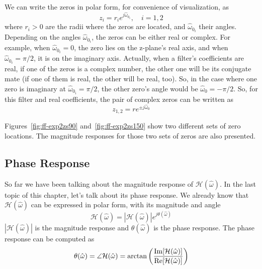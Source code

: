 We can write the zeros in polar form, for convenience of
visualization, as
\begin{equation}
z_{i}=r_i e^{j \hat{\omega}_{0_i}}, \quad i=1,2
\end{equation}
where $r_i>0$ are the radii where the zeros are located, and
$\hat{\omega}_{0_i}$ their angles.  Depending on the angles
$\hat{\omega}_{0_i}$, the zeros can be either real or complex. For
example, when $\hat{\omega}_{0_i}=0$, the zero lies on the z-plane's
real axis, and when $\hat{\omega}_{0_i}=\pi/2$, it is on the imaginary
axis. Actually, when a filter's coefficients are real, if one of the
zeros is a complex number, the other one will be its conjugate mate
(if one of them is real, the other will be real, too).  So, in the
case where one zero is imaginary at $\hat{\omega}_{0_i}=\pi/2$, the
other zero's angle would be $\hat{\omega}_0=-\pi/2$. So, for this
filter and real coefficients, the pair of complex zeros can be written
as
\begin{equation}
z_{1,2}=r e^{\pm j \hat{\omega}_0}
\label{eq:ff-zero}
\end{equation}

Figures~\ref{fig:ff-exp2zs90} and~\ref{fig:ff-exp2zs150} show two
different sets of zero locations. The magnitude responses for
those two sets of zeros are also presented.

\subsection{Phase Response}

So far we have been talking about the magnitude response of
$\mathcal{H}(\hat{\omega})$.  In the last topic of this chapter, let's
talk about its phase response. We already know that
$\mathcal{H}(\hat{\omega})$ can be expressed in polar form, with its
magnitude and angle
\begin{equation}
\mathcal{H}(\hat{\omega})=|\mathcal{H}(\hat{\omega})|e^{j \theta(\hat{\omega})}
\end{equation}
$|\mathcal{H}(\hat{\omega})|$ is the magnitude response and
$\theta(\hat{\omega})$ is the phase response. The phase response can
be computed as
\begin{equation}
\theta(\hat{\omega}) = \angle\mathcal{H}(\hat{\omega})
 = \arctan\left(\frac{\operatorname{Im}[\mathcal{H}(\hat{\omega})]}{\operatorname{Re}[\mathcal{H}(\hat{\omega})]}\right)
\label{eq:compute-phase-resp}
\end{equation}

